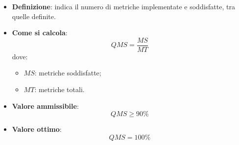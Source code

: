 \begin{itemize}
	\item \textbf{Definizione}: indica il numero di metriche implementate e soddisfatte, tra quelle definite.
	\item \textbf{Come si calcola}: \begin{equation*}QMS = \frac{MS}{MT}\end{equation*} dove:
		\begin{itemize}
			\item $MS$: metriche soddisfatte;
			\item $MT$: metriche totali.
		\end{itemize}
	\item \textbf{Valore ammissibile}: \begin{equation*}QMS \geq 90\%\end{equation*}
	\item \textbf{Valore ottimo}: \begin{equation*}QMS = 100\%\end{equation*}
\end{itemize}

